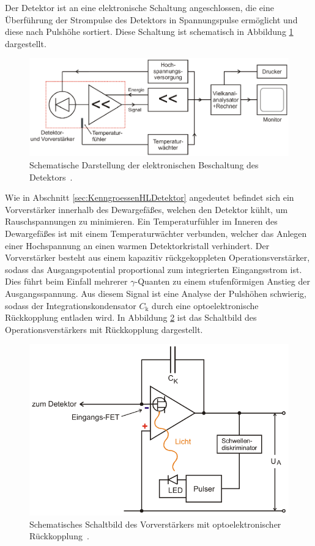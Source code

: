 Der Detektor ist an eine elektronische Schaltung angeschlossen, die eine Überführung
der Strompulse des Detektors in Spannungspulse ermöglicht und diese nach Pulshöhe sortiert.
Diese Schaltung ist schematisch in Abbildung \ref{fig:Gesamtschaltbild} dargestellt.
\begin{figure}
	\centering
	\includegraphics[width=.9\textwidth]{images/Gesamtschaltbild.pdf}
	\caption{Schematische Darstellung der elektronischen Beschaltung des Detektors~\cite[22]{anleitung}.}
	\label{fig:Gesamtschaltbild}
\end{figure}
Wie in Abschnitt \ref{sec:KenngroessenHLDetektor} angedeutet befindet sich ein Vorverstärker
innerhalb des Dewargefäßes, welchen den Detektor kühlt, um Rauschspannungen zu minimieren.
Ein Temperaturfühler im Inneren des Dewargefäßes ist mit einem Temperaturwächter verbunden,
welcher das Anlegen einer Hochspannung an einen warmen Detektorkristall verhindert.
Der Vorverstärker besteht aus einem kapazitiv rückgekoppleten Operationsverstärker, sodass
das Ausgangspotential proportional zum integrierten Eingangsstrom ist.
Dies führt beim Einfall mehrerer $\gamma$-Quanten zu einem stufenförmigen Anstieg der Ausgangsspannung.
Aus diesem Signal ist eine Analyse der Pulshöhen schwierig,
sodass der Integrationskondensator $C_\text{k}$ durch eine optoelektronische Rückkopplung
entladen wird. In Abbildung \ref{fig:Optoelektronische-Rueckkopplung} ist das Schaltbild
des Operationsverstärkers mit Rückkopplung dargestellt.
\begin{figure}
	\centering
	\includegraphics[width=.7\textwidth]{images/Optoelektronische-Rueckkopplung.pdf}
	\caption{Schematisches Schaltbild des Vorverstärkers mit optoelektronischer Rückkopplung~\cite[19]{anleitung}.}
	\label{fig:Optoelektronische-Rueckkopplung}
\end{figure}
